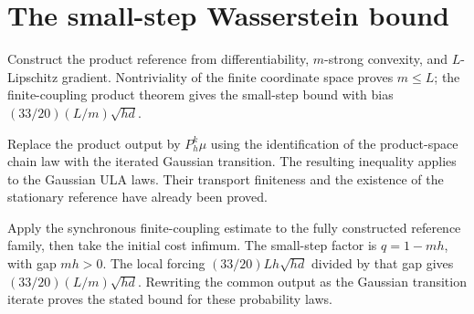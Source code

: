 \documentclass[11pt,a4paper]{article}
\begin{document}
\section{\texorpdfstring{The small-step Wasserstein bound}{The small-step Wasserstein bound}}


Construct the product reference from differentiability, \(m\)-strong convexity, and \(L\)-Lipschitz gradient. Nontriviality of the finite coordinate space proves \(m\le L\); the finite-coupling product theorem gives the small-step bound with bias \((33/20)(L/m)\sqrt{hd}\).



Replace the product output by \(P_h^k\mu\) using the identification of the product-space chain law with the iterated Gaussian transition. The resulting inequality applies to the Gaussian ULA laws. Their transport finiteness and the existence of the stationary reference have already been proved.



Apply the synchronous finite-coupling estimate to the fully constructed reference family, then take the initial cost infimum. The small-step factor is \(q=1-mh\), with gap \(mh>0\). The local forcing \((33/20)Lh\sqrt{hd}\) divided by that gap gives \((33/20)(L/m)\sqrt{hd}\). Rewriting the common output as the Gaussian transition iterate proves the stated bound for these probability laws.
\end{document}
